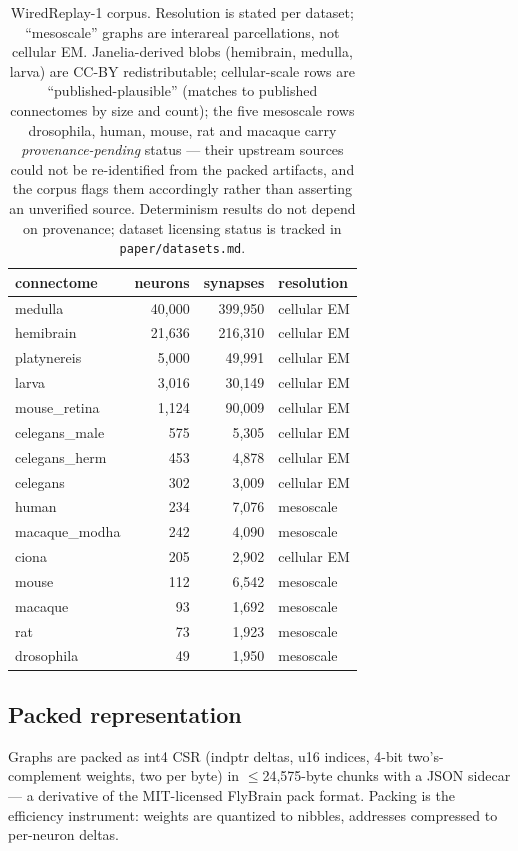 \documentclass[pdflatex,sn-basic]{sn-jnl}
\begin{document}
\begin{table}[t]
\centering\small
\caption{WiredReplay-1 corpus. Resolution is stated per dataset;
``mesoscale'' graphs are interareal parcellations, not cellular
EM. Janelia-derived blobs (hemibrain, medulla, larva) are CC-BY
redistributable; cellular-scale rows are ``published-plausible''
(matches to published connectomes by size and count); the five
mesoscale rows drosophila, human, mouse, rat and macaque carry
\emph{provenance-pending} status --- their upstream
sources could not be re-identified from the packed artifacts, and the
corpus flags them accordingly rather than asserting an unverified
source. Determinism results do not depend on provenance; dataset
licensing status is tracked in \texttt{paper/datasets.md}.}
\label{tab:datasets}
\begin{tabular}{@{}lrrl@{}}
\toprule
connectome & neurons & synapses & resolution \\
\midrule
medulla          & 40{,}000 & 399{,}950 & cellular EM \\
hemibrain        & 21{,}636 & 216{,}310 & cellular EM \\
platynereis      & 5{,}000  & 49{,}991  & cellular EM \\
larva            & 3{,}016  & 30{,}149  & cellular EM \\
mouse\_retina    & 1{,}124  & 90{,}009  & cellular EM \\
celegans\_male   & 575      & 5{,}305   & cellular EM \\
celegans\_herm   & 453      & 4{,}878   & cellular EM \\
celegans         & 302      & 3{,}009   & cellular EM \\
human            & 234      & 7{,}076   & mesoscale \\
macaque\_modha   & 242      & 4{,}090   & mesoscale \\
ciona            & 205      & 2{,}902   & cellular EM \\
mouse            & 112      & 6{,}542   & mesoscale \\
macaque          & 93       & 1{,}692   & mesoscale \\
rat              & 73       & 1{,}923   & mesoscale \\
drosophila       & 49       & 1{,}950   & mesoscale \\
\bottomrule
\end{tabular}
\end{table}

\subsection{Packed representation}
Graphs are packed as int4 CSR (indptr deltas, u16 indices, 4-bit
two's-complement weights, two per byte) in $\le$24{,}575-byte chunks
with a JSON sidecar --- a derivative of the MIT-licensed FlyBrain
pack format. Packing is the efficiency instrument: weights are
quantized to nibbles, addresses compressed to per-neuron deltas.
\end{document}
